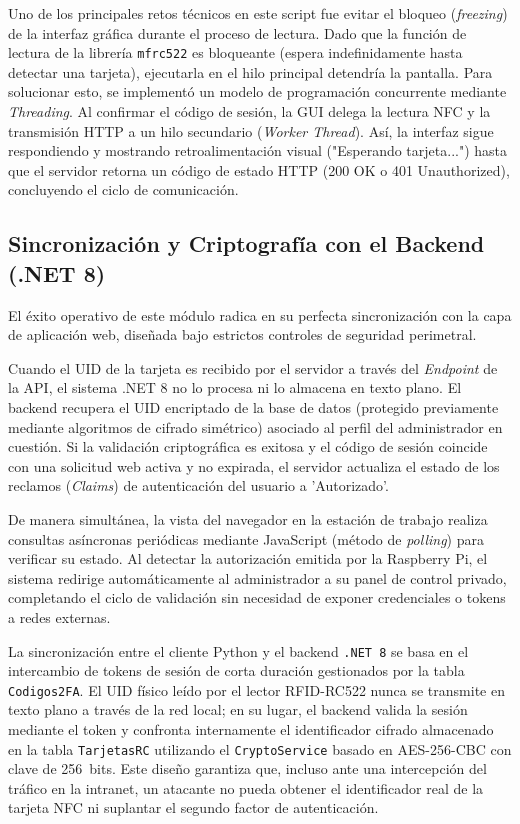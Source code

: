 Uno de los principales retos técnicos en este script fue evitar el bloqueo (\textit{freezing}) de la interfaz gráfica durante el proceso de lectura. Dado que la función de lectura de la librería \texttt{mfrc522} es bloqueante (espera indefinidamente hasta detectar una tarjeta), ejecutarla en el hilo principal detendría la pantalla. Para solucionar esto, se implementó un modelo de programación concurrente mediante \textit{Threading}. Al confirmar el código de sesión, la GUI delega la lectura NFC y la transmisión HTTP a un hilo secundario (\textit{Worker Thread}). Así, la interfaz sigue respondiendo y mostrando retroalimentación visual ("Esperando tarjeta...") hasta que el servidor retorna un código de estado HTTP (200 OK o 401 Unauthorized), concluyendo el ciclo de comunicación.


\subsection{Sincronización y Criptografía con el Backend (.NET 8)}

El éxito operativo de este módulo radica en su perfecta sincronización con la capa de aplicación web, diseñada bajo estrictos controles de seguridad perimetral. 

Cuando el UID de la tarjeta es recibido por el servidor a través del \textit{Endpoint} de la API, el sistema .NET 8 no lo procesa ni lo almacena en texto plano. El backend recupera el UID encriptado de la base de datos (protegido previamente mediante algoritmos de cifrado simétrico) asociado al perfil del administrador en cuestión. Si la validación criptográfica es exitosa y el código de sesión coincide con una solicitud web activa y no expirada, el servidor actualiza el estado de los reclamos (\textit{Claims}) de autenticación del usuario a 'Autorizado'.

De manera simultánea, la vista del navegador en la estación de trabajo realiza consultas asíncronas periódicas mediante JavaScript (método de \textit{polling}) para verificar su estado. Al detectar la autorización emitida por la Raspberry Pi, el sistema redirige automáticamente al administrador a su panel de control privado, completando el ciclo de validación sin necesidad de exponer credenciales o tokens a redes externas.

La sincronización entre el cliente Python y el backend \texttt{.NET~8} se basa en 
el intercambio de tokens de sesión de corta duración gestionados por la tabla 
\texttt{Codigos2FA}. El UID físico leído por el lector RFID-RC522 nunca se transmite 
en texto plano a través de la red local; en su lugar, el backend valida la sesión 
mediante el token y confronta internamente el identificador cifrado almacenado en 
la tabla \texttt{TarjetasRC} utilizando el \texttt{CryptoService} basado en 
AES-256-CBC con clave de 256~bits. Este diseño garantiza que, incluso ante una 
intercepción del tráfico en la intranet, un atacante no pueda obtener el 
identificador real de la tarjeta NFC ni suplantar el segundo factor de autenticación.


